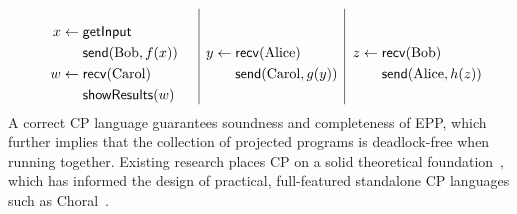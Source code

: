 \[
\begin{minipage}{.35\textwidth}
  \begin{equation*}
    \begin{split}
      x \leftarrow \; & \mathsf{getInput} \\
                      & \mathsf{send}(\mathrm{Bob}, f(x)) \\
      w \leftarrow \; & \mathsf{recv}(\mathrm{Carol}) \\
                      & \mathsf{showResults}(w)
    \end{split}
  \end{equation*}
\end{minipage}
\hfill\vline\hfill
\begin{minipage}{.3\textwidth}
  \begin{equation*}
    \begin{split}
      y \leftarrow \; & \mathsf{recv}(\mathrm{Alice}) \\
                      & \mathsf{send}(\mathrm{Carol}, g(y)) \\
    \end{split}
  \end{equation*}
\end{minipage}
\hfill\vline\hfill
\begin{minipage}{.3\textwidth}
  \begin{equation*}
    \begin{split}
      z \leftarrow \; & \mathsf{recv}(\mathrm{Bob}) \\
                      & \mathsf{send}(\mathrm{Alice}, h(z)) \\
    \end{split}
  \end{equation*}
\end{minipage}
\]
%
A correct CP language guarantees soundness and completeness of EPP, which further implies that the collection of projected programs is deadlock-free when running together.
%
Existing research places CP on a solid theoretical foundation~\citep{montesi-2013, cruzfilipe-2020, cruzfilipe-2022, hirsch-2022},
%
which has informed the design of practical, full-featured standalone CP languages such as Choral~\citep{giallorenzo-2024}.



